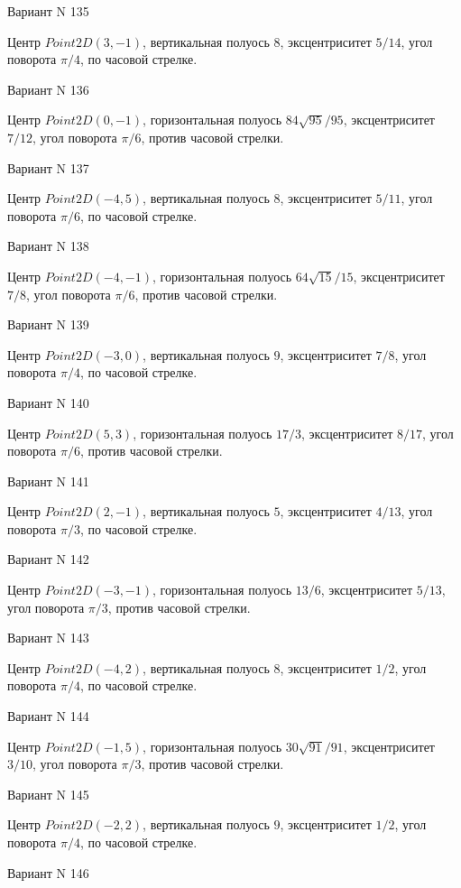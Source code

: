 \documentclass[11pt]{report}
\begin{document}
Вариант N 135

Центр $Point2D\left(3, -1\right)$, вертикальная полуось $8$, эксцентриситет $5 / 14$, угол поворота $\pi / 4$, по часовой стрелке.

Вариант N 136

Центр $Point2D\left(0, -1\right)$, горизонтальная полуось $84 \sqrt{95} / 95$, эксцентриситет $7 / 12$, угол поворота $\pi / 6$, против часовой стрелки.

Вариант N 137

Центр $Point2D\left(-4, 5\right)$, вертикальная полуось $8$, эксцентриситет $5 / 11$, угол поворота $\pi / 6$, по часовой стрелке.

Вариант N 138

Центр $Point2D\left(-4, -1\right)$, горизонтальная полуось $64 \sqrt{15} / 15$, эксцентриситет $7 / 8$, угол поворота $\pi / 6$, против часовой стрелки.

Вариант N 139

Центр $Point2D\left(-3, 0\right)$, вертикальная полуось $9$, эксцентриситет $7 / 8$, угол поворота $\pi / 4$, по часовой стрелке.

Вариант N 140

Центр $Point2D\left(5, 3\right)$, горизонтальная полуось $17 / 3$, эксцентриситет $8 / 17$, угол поворота $\pi / 6$, против часовой стрелки.

Вариант N 141

Центр $Point2D\left(2, -1\right)$, вертикальная полуось $5$, эксцентриситет $4 / 13$, угол поворота $\pi / 3$, по часовой стрелке.

Вариант N 142

Центр $Point2D\left(-3, -1\right)$, горизонтальная полуось $13 / 6$, эксцентриситет $5 / 13$, угол поворота $\pi / 3$, против часовой стрелки.

Вариант N 143

Центр $Point2D\left(-4, 2\right)$, вертикальная полуось $8$, эксцентриситет $1 / 2$, угол поворота $\pi / 4$, по часовой стрелке.

Вариант N 144

Центр $Point2D\left(-1, 5\right)$, горизонтальная полуось $30 \sqrt{91} / 91$, эксцентриситет $3 / 10$, угол поворота $\pi / 3$, против часовой стрелки.

Вариант N 145

Центр $Point2D\left(-2, 2\right)$, вертикальная полуось $9$, эксцентриситет $1 / 2$, угол поворота $\pi / 4$, по часовой стрелке.

Вариант N 146
\end{document}
